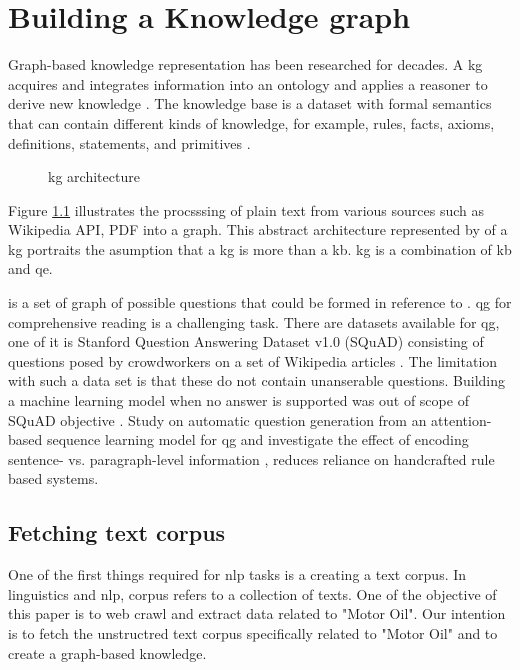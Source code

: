 \chapter{Building a Knowledge graph} \label{sec:building-kg}

Graph-based knowledge representation has been researched for decades.
A \acf{kg} acquires and integrates information into an ontology and applies a reasoner to derive new knowledge \parencite{LisaEhrlinger}.
The knowledge base is a dataset with formal semantics that can contain different kinds of knowledge, for example, rules, facts, axioms, definitions, statements, and primitives \parencite{Davies.2008cop.2006}.

\begin{figure}[h!]
    \centering
    
    \caption{\acl{kg} architecture}
    \label{fig:kg}
    \parencite[Chapter 4]{LisaEhrlinger}
\end{figure}

Figure \ref{fig:kg} illustrates the procsssing of plain text from various sources such as  Wikipedia API, PDF into a graph. This abstract architecture represented by  of a \acl{kg} portraits the asumption that a \acl{kg} is more than a \acf{kb}. \acl{kg} is a combination of \acl{kb} and \acf{qe}. 

 is a set of graph of possible questions that could be formed in reference to . \acf{qg} for comprehensive reading is a challenging task. There are datasets available for  \acs{qg}, one of it is Stanford Question Answering Dataset v1.0 (SQuAD) consisting of questions posed by crowdworkers on a set of Wikipedia articles \parencite{PranavRajpurkar.}. The limitation with such a data set is that these do not contain unanserable questions. Building a machine learning model when no answer is supported was out of scope of SQuAD objective \parencite{LupeHernandez}.  Study on automatic question generation from an attention-based sequence learning model for  \ac{qg} and investigate the effect of encoding sentence- vs. paragraph-level information \parencite{DuXinya.29042017}, reduces reliance on handcrafted rule based systems.

\clearpage

\section{Fetching text corpus}


One of the first things required for \acf*{nlp} tasks is a creating a text corpus.
In linguistics and \acs{nlp}, corpus refers to a collection of texts. One of the objective of this paper is to web crawl and extract data related to "Motor Oil". Our intention is to fetch the unstructred text corpus specifically related to "Motor Oil" and to create a graph-based knowledge. 

